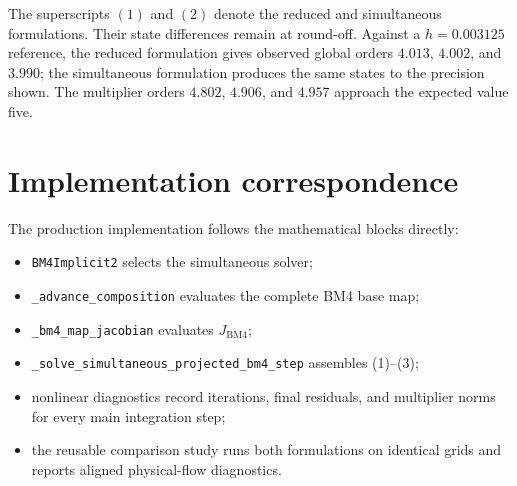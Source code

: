 \documentclass[11pt,a4paper]{article}
\begin{document}
The superscripts $(1)$ and $(2)$ denote the reduced and simultaneous
formulations.  Their state differences remain at round-off.  Against a
$h=0.003125$ reference, the reduced formulation gives observed global orders
$4.013$, $4.002$, and $3.990$; the simultaneous formulation produces the same
states to the precision shown.  The multiplier orders $4.802$, $4.906$, and
$4.957$ approach the expected value five.

\section{Implementation correspondence}

The production implementation follows the mathematical blocks directly:
\begin{itemize}
 \item \texttt{BM4Implicit2} selects the simultaneous solver;
 \item \texttt{\_advance\_composition} evaluates the complete BM4 base map;
 \item \texttt{\_bm4\_map\_jacobian} evaluates $J_{\mathrm{BM4}}$;
 \item \texttt{\_solve\_simultaneous\_projected\_bm4\_step} assembles (1)--(3);
 \item nonlinear diagnostics record iterations, final residuals, and multiplier
       norms for every main integration step;
 \item the reusable comparison study runs both formulations on identical grids
       and reports aligned physical-flow diagnostics.
\end{itemize}
\end{document}
